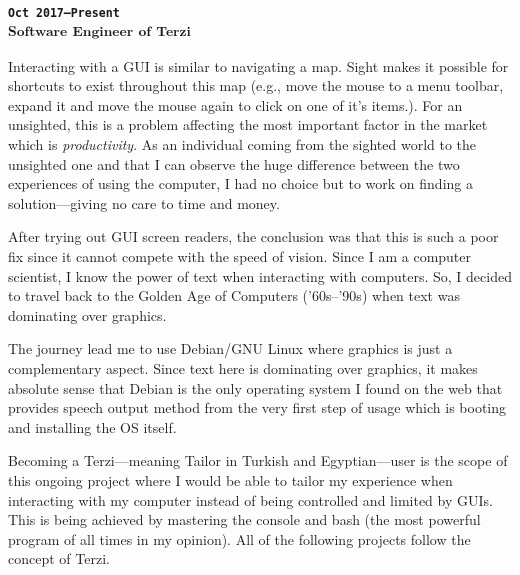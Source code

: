 \subsubsection{
\textsubscript{
\uppercase{\texttt{Oct 2017--Present}}\\
Software Engineer of Terzi
}
}
Interacting with a GUI is similar to navigating a map.
Sight makes it possible for shortcuts to exist throughout this map (e.g., move 
the mouse to a menu toolbar, expand it and move the mouse again to click on 
one of it's items.).
For an unsighted, this is a problem affecting the most important factor in the 
market which is \emph{productivity}.
As an individual coming from the sighted world to the unsighted one and that I 
can observe the huge difference between the two experiences of using the 
computer, I had no choice but to work on finding a solution---giving no care to 
time and money.

After trying out GUI screen readers, the conclusion was that this is such a poor 
fix since it cannot compete with the speed of vision.
Since I am a computer scientist, I know the power of text when interacting with 
computers.
So, I decided to travel back to the Golden Age of Computers ('60s--'90s) when 
text was dominating over graphics.

The journey lead me to use Debian/GNU Linux where graphics is just a 
complementary aspect.
Since text here is dominating over graphics, it makes absolute sense that Debian 
is the only operating system I found on the web that provides speech output 
method from the very first step of usage which is booting and installing the OS 
itself.

Becoming a Terzi---meaning Tailor in Turkish and Egyptian---user is the scope of 
this ongoing project where I would be able to tailor my experience when 
interacting with my computer instead of being controlled and limited by GUIs.
This is being achieved by mastering the console and bash (the most powerful 
program of all times in my opinion).
All of the following projects follow the concept of Terzi.
